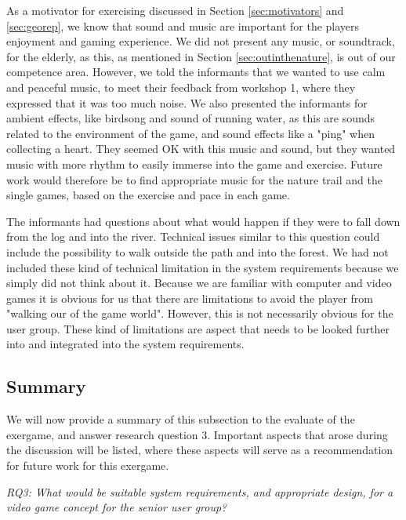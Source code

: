 As a motivator for exercising discussed in Section \ref{sec:motivators} and \ref{sec:georep}, we know that sound and music are important for the players enjoyment and gaming experience. We did not present any music, or soundtrack, for the elderly, as this, as mentioned in Section \ref{sec:outinthenature}, is out of our competence area. However, we told the informants that we wanted to use calm and peaceful music, to meet their feedback from workshop 1, where they expressed that it was too much noise. We also presented the informants for ambient effects, like birdsong and sound of running water, as this are sounds related to the environment of the game, and sound effects like a "ping" when collecting a heart. They seemed OK with this music and sound, but they wanted music with more rhythm to easily immerse into the game and exercise. Future work would therefore be to find appropriate music for the nature trail and the single games, based on the exercise and pace in each game. 

The informants had questions about what would happen if they were to fall down from the log and into the river. Technical issues similar to this question could include the possibility to walk outside the path and into the forest. We had not included these kind of technical limitation in the system requirements because we simply did not think about it. Because we are familiar with computer and video games it is obvious for us that there are limitations to avoid the player from "walking our of the game world". However, this is not necessarily obvious for the user group. These kind of limitations are aspect that needs to be looked further into and integrated into the system requirements.

\subsection{Summary}
\label{sec:summarydiscW2}
We will now provide a summary of this subsection to the evaluate of the exergame, and answer research question 3. Important aspects that arose during the discussion will be listed, where these aspects will serve as a recommendation for future work for this exergame. 

\emph{RQ3: What would be suitable system requirements, and appropriate design, for a video game concept for the senior user group?}

